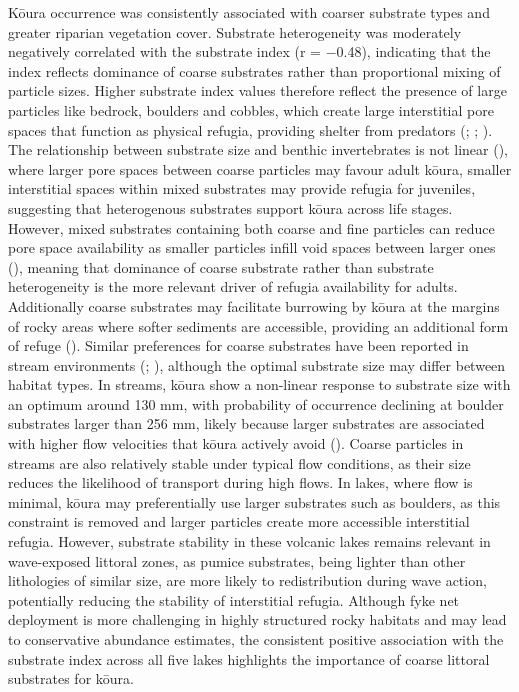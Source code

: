 \documentclass[
  letterpaper,
  DIV=11,
  numbers=noendperiod]{scrartcl}
\begin{document}
Kōura occurrence was consistently associated with coarser substrate
types and greater riparian vegetation cover. Substrate heterogeneity was
moderately negatively correlated with the substrate index (r = −0.48),
indicating that the index reflects dominance of coarse substrates rather
than proportional mixing of particle sizes. Higher substrate index
values therefore reflect the presence of large particles like bedrock,
boulders and cobbles, which create large interstitial pore spaces that
function as physical refugia, providing shelter from predators
(;
;
). The
relationship between substrate size and benthic invertebrates is not
linear (), where larger
pore spaces between coarse particles may favour adult kōura, smaller
interstitial spaces within mixed substrates may provide refugia for
juveniles, suggesting that heterogenous substrates support kōura across
life stages. However, mixed substrates containing both coarse and fine
particles can reduce pore space availability as smaller particles infill
void spaces between larger ones
(),
meaning that dominance of coarse substrate rather than substrate
heterogeneity is the more relevant driver of refugia availability for
adults. Additionally coarse substrates may facilitate burrowing by kōura
at the margins of rocky areas where softer sediments are accessible,
providing an additional form of refuge (). Similar preferences for coarse substrates have been
reported in stream environments (; ), although
the optimal substrate size may differ between habitat types. In streams,
kōura show a non-linear response to substrate size with an optimum
around 130 mm, with probability of occurrence declining at boulder
substrates larger than 256 mm, likely because larger substrates are
associated with higher flow velocities that kōura actively avoid
(). Coarse particles in
streams are also relatively stable under typical flow conditions, as
their size reduces the likelihood of transport during high flows. In
lakes, where flow is minimal, kōura may preferentially use larger
substrates such as boulders, as this constraint is removed and larger
particles create more accessible interstitial refugia. However,
substrate stability in these volcanic lakes remains relevant in
wave-exposed littoral zones, as pumice substrates, being lighter than
other lithologies of similar size, are more likely to redistribution
during wave action, potentially reducing the stability of interstitial
refugia. Although fyke net deployment is more challenging in highly
structured rocky habitats and may lead to conservative abundance
estimates, the consistent positive association with the substrate index
across all five lakes highlights the importance of coarse littoral
substrates for kōura.
\end{document}
